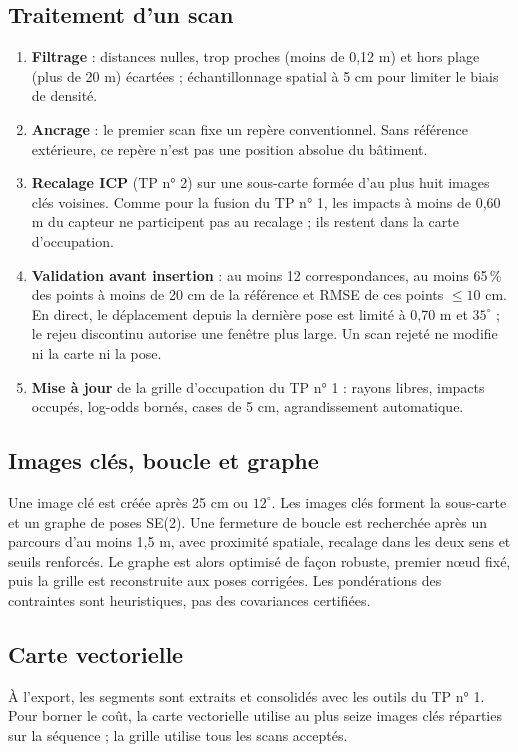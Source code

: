 \documentclass[11pt,a4paper]{article}
\begin{document}
\subsection{Traitement d'un scan}
\begin{enumerate}[nosep]
\item \textbf{Filtrage} : distances nulles, trop proches (moins de 0,12 m)
et hors plage (plus de 20 m) écartées ; échantillonnage spatial à 5 cm pour
limiter le biais de densité.
\item \textbf{Ancrage} : le premier scan fixe un repère conventionnel. Sans
référence extérieure, ce repère n'est pas une position absolue du bâtiment.
\item \textbf{Recalage ICP} (TP n° 2) sur une sous-carte formée d'au plus
huit images clés voisines. Comme pour la fusion du TP n° 1, les impacts à
moins de 0,60 m du capteur ne participent pas au recalage ; ils restent dans
la carte d'occupation.
\item \textbf{Validation avant insertion} : au moins 12 correspondances, au
moins 65\,\% des points à moins de 20 cm de la référence et RMSE de ces
points $\le 10$ cm. En direct, le déplacement depuis la dernière pose est
limité à 0,70 m et $35^\circ$ ; le rejeu discontinu autorise une fenêtre plus
large. Un scan rejeté ne modifie ni la carte ni la pose.
\item \textbf{Mise à jour} de la grille d'occupation du TP n° 1 : rayons
libres, impacts occupés, log-odds bornés, cases de 5 cm, agrandissement
automatique.
\end{enumerate}

\subsection{Images clés, boucle et graphe}
Une image clé est créée après 25 cm ou $12^\circ$. Les images clés forment la
sous-carte et un graphe de poses SE(2). Une fermeture de boucle est
recherchée après un parcours d'au moins 1,5 m, avec proximité spatiale,
recalage dans les deux sens et seuils renforcés. Le graphe est alors
optimisé de façon robuste, premier nœud fixé, puis la grille est
reconstruite aux poses corrigées. Les pondérations des contraintes sont
heuristiques, pas des covariances certifiées.

\subsection{Carte vectorielle}
À l'export, les segments sont extraits et consolidés avec les outils du
TP n° 1. Pour borner le coût, la carte vectorielle utilise au plus seize
images clés réparties sur la séquence ; la grille utilise tous les scans
acceptés.
\end{document}
